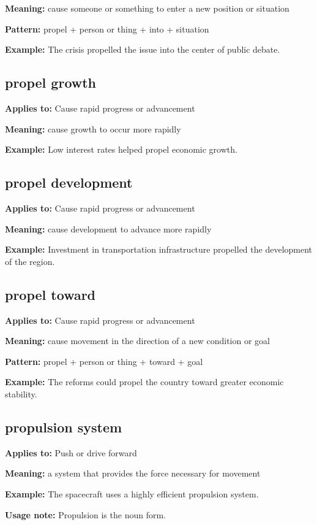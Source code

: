 \documentclass[11pt]{article}
\begin{document}
\textbf{Meaning:} cause someone or something to enter a new position or situation

\textbf{Pattern:} propel + person or thing + into + situation

\textbf{Example:} The crisis propelled the issue into the center of public debate.

\subsection{propel growth}
\textbf{Applies to:} Cause rapid progress or advancement

\textbf{Meaning:} cause growth to occur more rapidly

\textbf{Example:} Low interest rates helped propel economic growth.

\subsection{propel development}
\textbf{Applies to:} Cause rapid progress or advancement

\textbf{Meaning:} cause development to advance more rapidly

\textbf{Example:} Investment in transportation infrastructure propelled the development of the region.

\subsection{propel toward}
\textbf{Applies to:} Cause rapid progress or advancement

\textbf{Meaning:} cause movement in the direction of a new condition or goal

\textbf{Pattern:} propel + person or thing + toward + goal

\textbf{Example:} The reforms could propel the country toward greater economic stability.

\subsection{propulsion system}
\textbf{Applies to:} Push or drive forward

\textbf{Meaning:} a system that provides the force necessary for movement

\textbf{Example:} The spacecraft uses a highly efficient propulsion system.

\textbf{Usage note:} Propulsion is the noun form.
\end{document}
